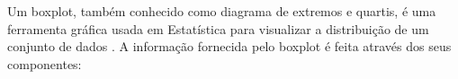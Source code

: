 %
%
%
%
%

Um boxplot, também conhecido como diagrama de extremos e quartis, é uma ferramenta gráfica usada em Estatística para visualizar a distribuição de um conjunto de dados \cite{casella2002statistical} \cite{ross2014introduction}. A informação fornecida pelo boxplot é feita através dos seus componentes: 

